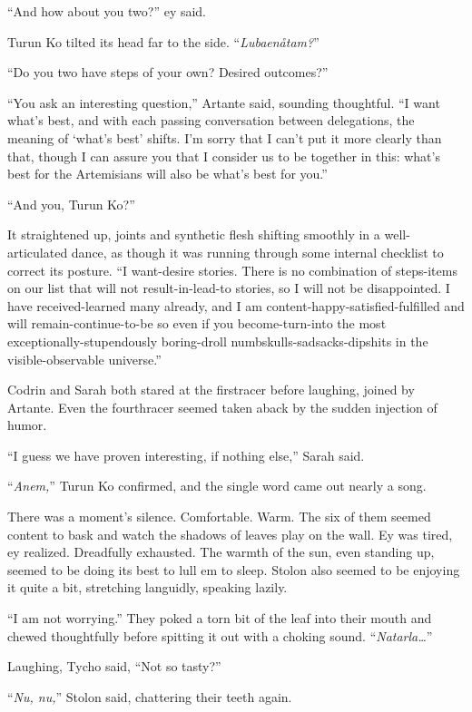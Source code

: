 ``And how about you two?'' ey said.

Turun Ko tilted its head far to the side. ``\emph{Lubaenåtam?}''

``Do you two have steps of your own? Desired outcomes?''

``You ask an interesting question,'' Artante said, sounding thoughtful. ``I want what's best, and with each passing conversation between delegations, the meaning of `what's best' shifts. I'm sorry that I can't put it more clearly than that, though I can assure you that I consider us to be together in this: what's best for the Artemisians will also be what's best for you.''

``And you, Turun Ko?''

It straightened up, joints and synthetic flesh shifting smoothly in a well-articulated dance, as though it was running through some internal checklist to correct its posture. ``I want-desire stories. There is no combination of steps-items on our list that will not result-in-lead-to stories, so I will not be disappointed. I have received-learned many already, and I am content-happy-satisfied-fulfilled and will remain-continue-to-be so even if you become-turn-into the most exceptionally-stupendously boring-droll numbskulls-sadsacks-dipshits in the visible-observable universe.''

Codrin and Sarah both stared at the firstracer before laughing, joined by Artante. Even the fourthracer seemed taken aback by the sudden injection of humor.

``I guess we have proven interesting, if nothing else,'' Sarah said.

``\emph{Anem,}'' Turun Ko confirmed, and the single word came out nearly a song.

There was a moment's silence. Comfortable. Warm. The six of them seemed content to bask and watch the shadows of leaves play on the wall. Ey was tired, ey realized. Dreadfully exhausted. The warmth of the sun, even standing up, seemed to be doing its best to lull em to sleep. Stolon also seemed to be enjoying it quite a bit, stretching languidly, speaking lazily.

``I am not worrying.'' They poked a torn bit of the leaf into their mouth and chewed thoughtfully before spitting it out with a choking sound. ``\emph{Natarla\ldots{}}''

Laughing, Tycho said, ``Not so tasty?''

``\emph{Nu, nu,}'' Stolon said, chattering their teeth again.

